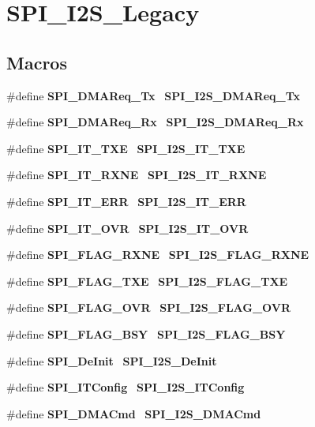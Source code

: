 \section{S\+P\+I\+\_\+\+I2\+S\+\_\+\+Legacy}
\label{group__SPI__I2S__Legacy}
\subsection*{Macros}
\begin{DoxyCompactItemize}
\item 
\#define \textbf{ S\+P\+I\+\_\+\+D\+M\+A\+Req\+\_\+\+Tx}~\textbf{ S\+P\+I\+\_\+\+I2\+S\+\_\+\+D\+M\+A\+Req\+\_\+\+Tx}
\item 
\#define \textbf{ S\+P\+I\+\_\+\+D\+M\+A\+Req\+\_\+\+Rx}~\textbf{ S\+P\+I\+\_\+\+I2\+S\+\_\+\+D\+M\+A\+Req\+\_\+\+Rx}
\item 
\#define \textbf{ S\+P\+I\+\_\+\+I\+T\+\_\+\+T\+XE}~\textbf{ S\+P\+I\+\_\+\+I2\+S\+\_\+\+I\+T\+\_\+\+T\+XE}
\item 
\#define \textbf{ S\+P\+I\+\_\+\+I\+T\+\_\+\+R\+X\+NE}~\textbf{ S\+P\+I\+\_\+\+I2\+S\+\_\+\+I\+T\+\_\+\+R\+X\+NE}
\item 
\#define \textbf{ S\+P\+I\+\_\+\+I\+T\+\_\+\+E\+RR}~\textbf{ S\+P\+I\+\_\+\+I2\+S\+\_\+\+I\+T\+\_\+\+E\+RR}
\item 
\#define \textbf{ S\+P\+I\+\_\+\+I\+T\+\_\+\+O\+VR}~\textbf{ S\+P\+I\+\_\+\+I2\+S\+\_\+\+I\+T\+\_\+\+O\+VR}
\item 
\#define \textbf{ S\+P\+I\+\_\+\+F\+L\+A\+G\+\_\+\+R\+X\+NE}~\textbf{ S\+P\+I\+\_\+\+I2\+S\+\_\+\+F\+L\+A\+G\+\_\+\+R\+X\+NE}
\item 
\#define \textbf{ S\+P\+I\+\_\+\+F\+L\+A\+G\+\_\+\+T\+XE}~\textbf{ S\+P\+I\+\_\+\+I2\+S\+\_\+\+F\+L\+A\+G\+\_\+\+T\+XE}
\item 
\#define \textbf{ S\+P\+I\+\_\+\+F\+L\+A\+G\+\_\+\+O\+VR}~\textbf{ S\+P\+I\+\_\+\+I2\+S\+\_\+\+F\+L\+A\+G\+\_\+\+O\+VR}
\item 
\#define \textbf{ S\+P\+I\+\_\+\+F\+L\+A\+G\+\_\+\+B\+SY}~\textbf{ S\+P\+I\+\_\+\+I2\+S\+\_\+\+F\+L\+A\+G\+\_\+\+B\+SY}
\item 
\#define \textbf{ S\+P\+I\+\_\+\+De\+Init}~\textbf{ S\+P\+I\+\_\+\+I2\+S\+\_\+\+De\+Init}
\item 
\#define \textbf{ S\+P\+I\+\_\+\+I\+T\+Config}~\textbf{ S\+P\+I\+\_\+\+I2\+S\+\_\+\+I\+T\+Config}
\item 
\#define \textbf{ S\+P\+I\+\_\+\+D\+M\+A\+Cmd}~\textbf{ S\+P\+I\+\_\+\+I2\+S\+\_\+\+D\+M\+A\+Cmd}

\end{DoxyCompactItemize}
